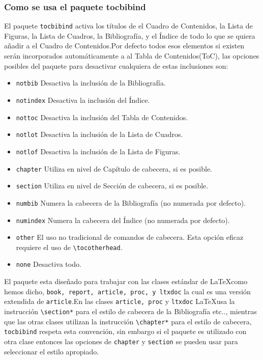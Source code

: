 	\subsubsection{Como se usa el paquete tocbibind}
	El paquete \verb+tocbibind+ activa los títulos de el Cuadro de Contenidos, la Lista de Figuras, la Lista de Cuadros, la Bibliografía, y el Índice de todo  lo que se quiera añadir a el Cuadro de Contenidos.Por defecto todos esos elementos si existen serán incorporados automáticamente a al Tabla de Contenidos(ToC), las opciones posibles del paquete para desactivar cualquiera de estas inclusiones son:\\
	\begin{center}
	 \begin{itemize}
	  \item \verb+notbib+ Desactiva la inclusión de la Bibliografía.
	  \item \verb+notindex+ Desactiva la inclusión del Índice.
	  \item \verb+nottoc+ Desactiva la inclusión del Tabla de Contenidos.
	  \item \verb+notlot+ Desactiva la inclusión de la Lista de Cuadros.
	  \item \verb+notlof+ Desactiva la inclusión de la Lista de Figuras.
	  \item \verb+chapter+ Utiliza en nivel de Capítulo de cabecera, si es posible.
	  \item \verb+section+ Utiliza en nivel de Sección de cabecera, si es posible.
	  \item \verb+numbib+ Numera la cabecera de la Bibliografía (no numerada por defecto).
       	  \item \verb+numindex+ Numera la cabecera del Índice (no numerada por defecto).
	  \item \verb+other+ El uso no tradicional de comandos de cabecera. Esta opción eficaz requiere el uso de \verb+\tocotherhead+.
	  \item \verb+none+ Desactiva todo.
	 \end{itemize}
	\end{center}
	El paquete esta diseñado para trabajar con las clases estándar de \LaTeX como hemos dicho, \verb+book, report, article, proc, y ltxdoc+ la cual es una versión extendida de \verb+article+.En las clases \verb+article, proc+ y \verb+ltxdoc+ \LaTeX usa la instrucción \verb+\section*+ para el estilo de cabecera de la Bibliografía etc.., mientras que las otras clases utilizan la instrucción \verb+\chapter*+ para el estilo de cabecera, \verb+tocbibind+  respeta esta convención,  sin embargo si el paquete es utilizado con otra clase entonces las opciones de \verb+chapter+ y \verb+section+ se pueden usar para seleccionar el estilo apropiado.


